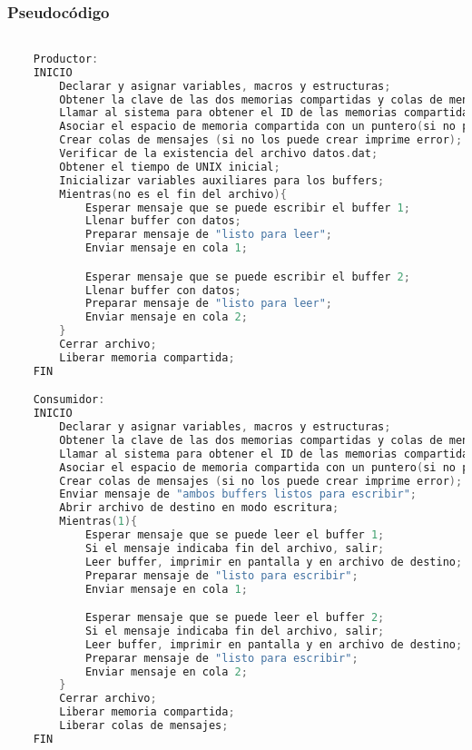 \subsubsection{Pseudocódigo}

\begin{lstlisting}[language=C]          % No usar tildes en el pseudocódigo y dejar una linea vacía al principio y al final

    Productor:
    INICIO
        Declarar y asignar variables, macros y estructuras;
        Obtener la clave de las dos memorias compartidas y colas de mensaje (en el caso de que no las obtenga imprime error);
        Llamar al sistema para obtener el ID de las memorias compartidas (en el caso de que no las obtenga imprime error);
        Asociar el espacio de memoria compartida con un puntero(si no puede asociar imprime error);
        Crear colas de mensajes (si no los puede crear imprime error);
        Verificar de la existencia del archivo datos.dat;
        Obtener el tiempo de UNIX inicial;
        Inicializar variables auxiliares para los buffers;
        Mientras(no es el fin del archivo){
            Esperar mensaje que se puede escribir el buffer 1;
            Llenar buffer con datos;
            Preparar mensaje de "listo para leer";
            Enviar mensaje en cola 1;

            Esperar mensaje que se puede escribir el buffer 2;
            Llenar buffer con datos;
            Preparar mensaje de "listo para leer";
            Enviar mensaje en cola 2;
        }
        Cerrar archivo;
        Liberar memoria compartida;
    FIN

    Consumidor:
    INICIO
        Declarar y asignar variables, macros y estructuras;
        Obtener la clave de las dos memorias compartidas y colas de mensaje (en el caso de que no las obtenga imprime error);
        Llamar al sistema para obtener el ID de las memorias compartidas (en el caso de que no las obtenga imprime error);
        Asociar el espacio de memoria compartida con un puntero(si no puede asociar imprime error);
        Crear colas de mensajes (si no los puede crear imprime error);
        Enviar mensaje de "ambos buffers listos para escribir";
        Abrir archivo de destino en modo escritura;
        Mientras(1){
            Esperar mensaje que se puede leer el buffer 1;
            Si el mensaje indicaba fin del archivo, salir;
            Leer buffer, imprimir en pantalla y en archivo de destino;
            Preparar mensaje de "listo para escribir";
            Enviar mensaje en cola 1;

            Esperar mensaje que se puede leer el buffer 2;
            Si el mensaje indicaba fin del archivo, salir;
            Leer buffer, imprimir en pantalla y en archivo de destino;
            Preparar mensaje de "listo para escribir";
            Enviar mensaje en cola 2;
        }
        Cerrar archivo;
        Liberar memoria compartida;
        Liberar colas de mensajes;
    FIN
    
\end{lstlisting}

